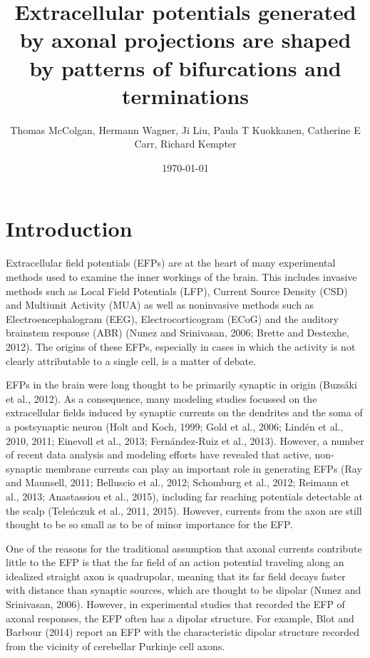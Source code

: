 \documentclass[]{article}
\title{Extracellular potentials generated by axonal projections are shaped by
patterns of bifurcations and terminations}
\author{Thomas McColgan, Hermann Wagner, Ji Liu, Paula T Kuokkanen, Catherine E
Carr, Richard Kempter}
\date{\today}
\begin{document}
\maketitle

\section{Introduction}\label{introduction}

Extracellular field potentials (EFPs) are at the heart of many
experimental methods used to examine the inner workings of the brain.
This includes invasive methods such as Local Field Potentials (LFP),
Current Source Density (CSD) and Multiunit Activity (MUA) as well as
noninvasive methods such as Electroencephalogram (EEG),
Electrocorticogram (ECoG) and the auditory brainstem response (ABR)
(Nunez and Srinivasan, 2006; Brette and Destexhe, 2012). The origins of
these EFPs, especially in cases in which the activity is not clearly
attributable to a single cell, is a matter of debate.

EFPs in the brain were long thought to be primarily synaptic in origin
(Buzsáki et al., 2012). As a consequence, many modeling studies focussed
on the extracellular fields induced by synaptic currents on the
dendrites and the soma of a postsynaptic neuron (Holt and Koch, 1999;
Gold et al., 2006; Lindén et al., 2010, 2011; Einevoll et al., 2013;
Fernández-Ruiz et al., 2013). However, a number of recent data analysis
and modeling efforts have revealed that active, non-synaptic membrane
currents can play an important role in generating EFPs (Ray and
Maunsell, 2011; Belluscio et al., 2012; Schomburg et al., 2012; Reimann
et al., 2013; Anastassiou et al., 2015), including far reaching
potentials detectable at the scalp (Teleńczuk et al., 2011, 2015).
However, currents from the axon are still thought to be so small as to
be of minor importance for the EFP.

One of the reasons for the traditional assumption that axonal currents
contribute little to the EFP is that the far field of an action
potential traveling along an idealized straight axon is quadrupolar,
meaning that its far field decays faster with distance than synaptic
sources, which are thought to be dipolar (Nunez and Srinivasan, 2006).
However, in experimental studies that recorded the EFP of axonal
responses, the EFP often has a dipolar structure. For example, Blot and
Barbour (2014) report an EFP with the characteristic dipolar structure
recorded from the vicinity of cerebellar Purkinje cell axons.
\end{document}
